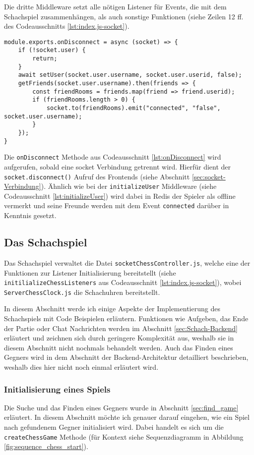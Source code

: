 Die dritte Middleware setzt alle nötigen Listener für Events, die mit dem Schachspiel zusammenhängen, als auch sonstige Funktionen (siehe Zeilen 12 ff. des Codeausschnitts \ref{lst:index.js-socket}).

\begin{lstlisting}[style=codeStyle, caption={Die onDisconnect Methode für Sockets}, label={lst:onDisconnect}]
module.exports.onDisconnect = async (socket) => {
    if (!socket.user) {
        return;
    }
    await setUser(socket.user.username, socket.user.userid, false);
    getFriends(socket.user.username).then(friends => {
        const friendRooms = friends.map(friend => friend.userid);
        if (friendRooms.length > 0) {
            socket.to(friendRooms).emit("connected", "false", socket.user.username);
        }
    });
}
\end{lstlisting}

Die \verb|onDisconnect| Methode aus Codeausschnitt \ref{lst:onDisconnect} wird aufgerufen, sobald eine socket Verbindung getrennt wird. Hierfür dient der \verb|socket.disconnect()| Aufruf des Frontends (siehe Abschnitt \ref{sec:socket-Verbindung}). Ähnlich wie bei der \verb|initializeUser| Middleware (siehe Codeausschnitt \ref{lst:initializeUser}) wird dabei in Redis der Spieler als offline vermerkt und seine Freunde werden mit dem Event \verb|connected| darüber in Kenntnis gesetzt.


\subsection{Das Schachspiel}
\label{sec:Schach-Backend-impl}
Das Schachspiel verwaltet die Datei \verb|socketChessController.js|, welche eine der Funktionen zur Listener Initialisierung bereitstellt (siehe \verb|initilializeChessListeners| aus Codeausschnitt \ref{lst:index.js-socket}), wobei \verb|ServerChessClock.js| die Schachuhren bereitstellt.

In diesem Abschnitt werde ich einige Aspekte der Implementierung des Schachspiels mit Code Beispielen erläutern. Funktionen wie Aufgeben, das Ende der Partie oder Chat Nachrichten werden im Abschnitt \ref{sec:Schach-Backend} erläutert und zeichnen sich durch geringere Komplexität aus, weshalb sie in diesem Abschnitt nicht nochmals behandelt werden. Auch das Finden eines Gegners wird in dem Abschnitt der Backend-Architektur detailliert beschrieben, weshalb dies hier nicht noch einmal erläutert wird.

\subsubsection{Initialisierung eines Spiels}
\label{sec:init-backend}
Die Suche und das Finden eines Gegners wurde in Abschnitt \ref{sec:find_game} erläutert. In diesem Abschnitt möchte ich genauer darauf eingehen, wie ein Spiel nach gefundenem Gegner initialisiert wird. Dabei handelt es sich um die \verb|createChessGame| Methode (für Kontext siehe Sequenzdiagramm in Abbildung \ref{fig:sequence_chess_start}).

